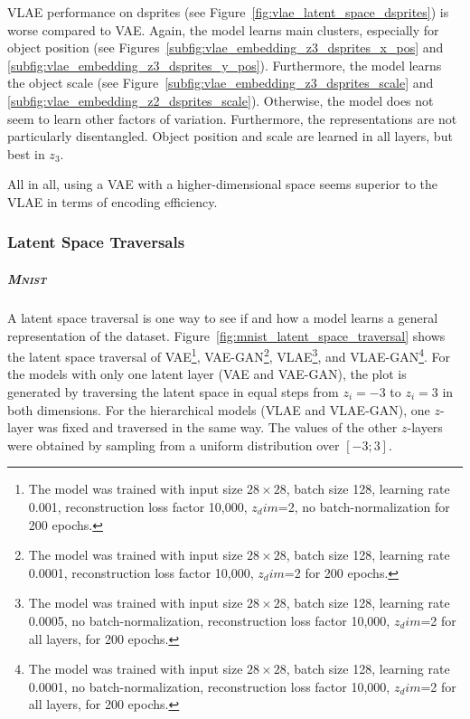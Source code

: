 \ac{VLAE} performance on dsprites (see Figure~\ref{fig:vlae_latent_space_dsprites}) is worse compared to \ac{VAE}.
Again, the model learns main clusters, especially for object position (see Figures~\ref{subfig:vlae_embedding_z3_dsprites_x_pos} and \ref{subfig:vlae_embedding_z3_dsprites_y_pos}).
Furthermore, the model learns the object scale (see Figure~\ref{subfig:vlae_embedding_z3_dsprites_scale} and \ref{subfig:vlae_embedding_z2_dsprites_scale}).
Otherwise, the model does not seem to learn other factors of variation.
Furthermore, the representations are not particularly disentangled.
Object position and scale are learned in all layers, but best in $z_3$.

All in all, using a \ac{VAE} with a higher-dimensional space seems superior to the \ac{VLAE} in terms of encoding efficiency.

\subsubsection{Latent Space Traversals}\label{subsubsec:latent_space_traversals}

\subparagraph{\textsc{Mnist}}

A latent space traversal is one way to see if and how a model learns a general representation of the dataset.
Figure~\ref{fig:mnist_latent_space_traversal} shows the latent space traversal of \ac{VAE}\footnote{The model was trained with input size $28\times 28$, batch size 128, learning rate 0.001, reconstruction loss factor 10,000, $z_dim$=2, no batch-normalization for 200 epochs.}, \ac{VAE}-\ac{GAN}\footnote{The model was trained with input size $28\times 28$, batch size 128, learning rate 0.0001, reconstruction loss factor 10,000, $z_dim$=2 for 200 epochs.}, \ac{VLAE}\footnote{The model was trained with input size $28\times 28$, batch size 128, learning rate 0.0005, no batch-normalization, reconstruction loss factor 10,000, $z_dim$=2 for all layers, for 200 epochs.}, and \ac{VLAE}-\ac{GAN}\footnote{The model was trained with input size $28\times 28$, batch size 128, learning rate 0.0001, no batch-normalization, reconstruction loss factor 10,000, $z_dim$=2 for all layers, for 200 epochs.}.
For the models with only one latent layer (\ac{VAE} and \ac{VAE}-\ac{GAN}), the plot is generated by traversing the latent space in equal steps from $z_i = -3$ to $z_i = 3$ in both dimensions.
For the hierarchical models (\ac{VLAE} and \ac{VLAE}-\ac{GAN}), one $z$-layer was fixed and traversed in the same way.
The values of the other $z$-layers were obtained by sampling from a uniform distribution over $[-3; 3]$.

